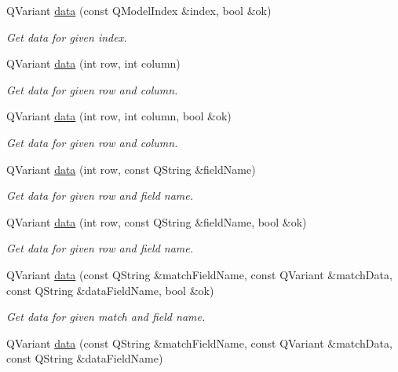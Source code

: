 \begin{DoxyCompactItemize}
Q\-Variant \hyperlink{classmdt_abstract_sql_table_controller_a25fec3a81261364e248332a71b01822e}{data} (const Q\-Model\-Index \&index, bool \&ok)
\begin{DoxyCompactList}\small\item\em Get data for given index. \end{DoxyCompactList}\item 
Q\-Variant \hyperlink{classmdt_abstract_sql_table_controller_af1d1cc870f914ee8278884a118325fba}{data} (int row, int column)
\begin{DoxyCompactList}\small\item\em Get data for given row and column. \end{DoxyCompactList}\item 
Q\-Variant \hyperlink{classmdt_abstract_sql_table_controller_a09ac7fcd64c6d75ebbbd15ab30957674}{data} (int row, int column, bool \&ok)
\begin{DoxyCompactList}\small\item\em Get data for given row and column. \end{DoxyCompactList}\item 
Q\-Variant \hyperlink{classmdt_abstract_sql_table_controller_a83e15b11cdbdd9455049454dca6d4331}{data} (int row, const Q\-String \&field\-Name)
\begin{DoxyCompactList}\small\item\em Get data for given row and field name. \end{DoxyCompactList}\item 
Q\-Variant \hyperlink{classmdt_abstract_sql_table_controller_a99a52795749a325b8b96096cffe60866}{data} (int row, const Q\-String \&field\-Name, bool \&ok)
\begin{DoxyCompactList}\small\item\em Get data for given row and field name. \end{DoxyCompactList}\item 
Q\-Variant \hyperlink{classmdt_abstract_sql_table_controller_a40af55ec0b11a0a81f748662c912b761}{data} (const Q\-String \&match\-Field\-Name, const Q\-Variant \&match\-Data, const Q\-String \&data\-Field\-Name, bool \&ok)
\begin{DoxyCompactList}\small\item\em Get data for given match and field name. \end{DoxyCompactList}\item 
Q\-Variant \hyperlink{classmdt_abstract_sql_table_controller_a497441f3486c77cc832181fe34bd6492}{data} (const Q\-String \&match\-Field\-Name, const Q\-Variant \&match\-Data, const Q\-String \&data\-Field\-Name)

\end{DoxyCompactItemize}
